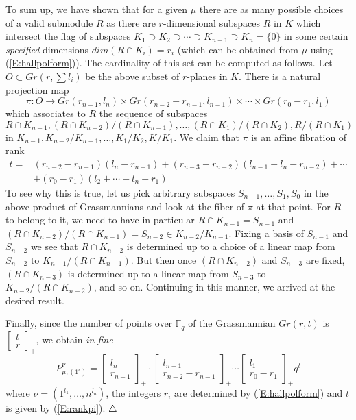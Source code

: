 \documentclass[a4paper,10pt]{amsart}
\def\endexample{$\hfill \triangle$}
\numberwithin{equation}{section}
\begin{document}
To sum up, we have shown that for a given $\mu$ there are as many possible choices of a valid submodule $R$ as there are $r$-dimensional subspaces $R$ in $K$ which intersect the flag of subspaces $K_1 \supset K_2 \supset \cdots \supset K_{n-1} \supset K_n=\{0\}$ in some certain \textit{specified} dimensions ${dim}(R \cap K_i)=r_i$ (which can be obtained from $\mu$ using (\ref{E:hallpolform})). The cardinality of this set can be computed as follows. Let ${O} \subset
Gr(r,\sum l_i)$ be the above subset of $r$-planes in $K$. There is a natural projection map
$$\pi: O \to Gr(r_{n-1},l_n) \times Gr(r_{n-2}-r_{n-1},l_{n-1}) \times \cdots \times Gr(r_0-r_1,l_1)$$
which associates to $R$ the sequence of subspaces
$$R \cap K_{n-1}, (R \cap K_{n-2})/(R \cap K_{n-1}), \ldots,  (R \cap K_{1})/(R \cap K_2), R/(R \cap K_1)$$
in $K_{n-1}, K_{n-2}/K_{n-1}, \ldots, K_1/K_2, K/K_1$. We claim that $\pi$ is an affine fibration of rank
\begin{equation}\label{E:rankpi}
\begin{split}
t=&(r_{n-2}-r_{n-1})(l_n-r_{n-1}) + (r_{n-3}-r_{n-2})(l_{n-1}+l_n-r_{n-2}) + \cdots \\
&+ (r_0-r_1)(l_2+ \cdots +l_n-r_1)
\end{split}
\end{equation}
To see why this is true, let us pick arbitrary subspaces $S_{n-1}, \ldots, S_1, S_0$ in the above product of Grassmannians and look at the fiber of $\pi$ at that point. For $R$ to belong to it, we need to have in particular $R \cap K_{n-1}=S_{n-1}$ and $(R \cap K_{n-2})/(R \cap K_{n-1})=S_{n-2} \in K_{n-2}/K_{n-1}$. Fixing a basis of $S_{n-1}$ and $S_{n-2}$ we see that $R \cap K_{n-2}$ is determined up to a choice of a linear map from $S_{n-2}$ to $K_{n-1}/(R \cap K_{n-1})$. But then once $(R \cap K_{n-2})$ and $S_{n-3}$ are fixed, $(R \cap K_{n-3})$ is determined up to a linear map from $S_{n-3}$ to $K_{n-2} / (R \cap K_{n-2})$, and so on. Continuing in this manner, we arrived at the desired result.

Finally, since the number of points over $\mathbb{F}_q$ of the Grassmannian $Gr(r,t)$ is $\begin{bmatrix} t \\ r \end{bmatrix}_+$, we obtain \textit{in fine}
$$P^{\nu}_{\mu, (1^r)}=\begin{bmatrix} l_n \\ r_{n-1} \end{bmatrix}_+ \cdot \begin{bmatrix} l_{n-1} \\ r_{n-2}-r_{n-1} \end{bmatrix}_+ \cdots \begin{bmatrix} l_1 \\ r_0-r_1 \end{bmatrix}_+ q^t$$
where $\nu=(1^{l_1}, \ldots, n^{l_n})$, the integers $r_i$ are determined by (\ref{E:hallpolform}) and $t$ is given by (\ref{E:rankpi}).
\endexample
\end{document}
